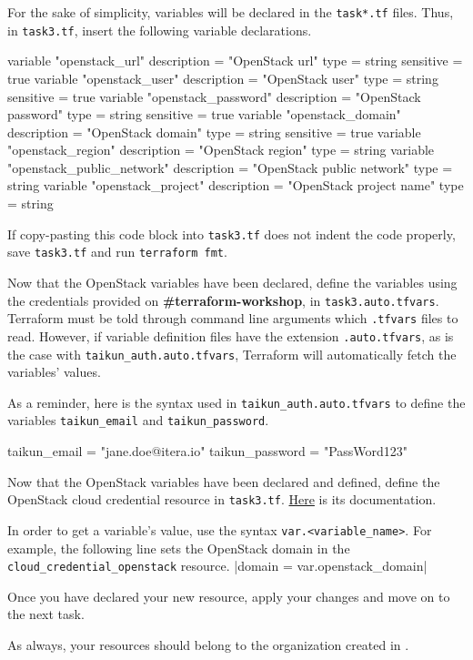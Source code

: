 For the sake of simplicity, variables will be declared in the \texttt{task*.tf} files.
Thus, in \texttt{task3.tf}, insert the following variable declarations.
\begin{tf}
variable "openstack_url" {
  description = "OpenStack url"
  type        = string
  sensitive   = true
}
variable "openstack_user" {
  description = "OpenStack user"
  type        = string
  sensitive   = true
}
variable "openstack_password" {
  description = "OpenStack password"
  type        = string
  sensitive   = true
}
variable "openstack_domain" {
  description = "OpenStack domain"
  type        = string
  sensitive   = true
}
variable "openstack_region" {
  description = "OpenStack region"
  type        = string
}
variable "openstack_public_network" {
  description = "OpenStack public network"
  type        = string
}
variable "openstack_project" {
  description = "OpenStack project name"
  type        = string
}
\end{tf}
\begin{note}
  If copy-pasting this code block into \texttt{task3.tf} does not indent the code properly,
  save \texttt{task3.tf} and run \texttt{terraform fmt}.
\end{note}

Now that the OpenStack variables have been declared,
define the variables using the credentials provided on \textbf{\#terraform-workshop}, in \texttt{task3.auto.tfvars}.\\

Terraform must be told through command line arguments which \texttt{.tfvars} files to read.
However, if variable definition files have the extension \texttt{.auto.tfvars}, as is the case with
\texttt{taikun\_auth.auto.tfvars}, Terraform will automatically fetch the variables' values.
\begin{tip}
As a reminder, here is the syntax used in \texttt{taikun\_auth.auto.tfvars} to define the variables \texttt{taikun\_email}
and \texttt{taikun\_password}.
\begin{tf}
taikun_email = "jane.doe@itera.io"
taikun_password = "PassWord123"
\end{tf}
\end{tip}

Now that the OpenStack variables have been declared and defined, define the OpenStack cloud credential resource in \texttt{task3.tf}.
\href{https://registry.terraform.io/providers/itera-io/taikun/latest/docs/resources/cloud_credential_openstack}{Here} is its documentation.

\begin{tip}
In order to get a variable's value, use the syntax \texttt{var.<variable\_name>}.
For example, the following line sets the OpenStack domain in the \texttt{cloud\_credential\_openstack} resource.
|domain = var.openstack_domain|
\end{tip}

Once you have declared your new resource, apply your changes and move on to the next task.

\begin{warn}
As always, your resources should belong to the organization created in
.
\end{warn}


